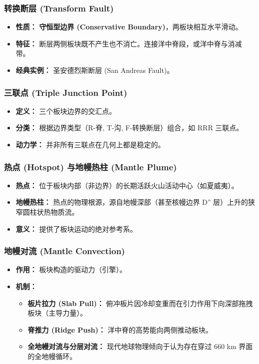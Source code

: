 \documentclass[12pt,a4paper]{article}
\begin{document}
	\subsubsection{转换断层 (Transform Fault)}
	\begin{itemize}
		\item \textbf{性质：} \textbf{守恒型边界 (Conservative Boundary)}，两板块相互水平滑动。
		\item \textbf{特征：} 断层两侧板块既不产生也不消亡。连接洋中脊段，或洋中脊与消减带。
		\item \textbf{经典实例：} 圣安德烈斯断层 (San Andreas Fault)。
	\end{itemize}
	
	\subsubsection{三联点 (Triple Junction Point)}
	\begin{itemize}
		\item \textbf{定义：} 三个板块边界的交汇点。
		\item \textbf{分类：} 根据边界类型（R-脊, T-沟, F-转换断层）组合，如 RRR 三联点。
		\item \textbf{动力学：} 并非所有三联点在几何上都是稳定的。
	\end{itemize}
	
	\subsubsection{热点 (Hotspot) 与地幔热柱 (Mantle Plume)}
	\begin{itemize}
		\item \textbf{热点：} 位于板块内部（非边界）的长期活跃火山活动中心（如夏威夷）。
		\item \textbf{地幔热柱：} 热点的物理根源，源自地幔深部（甚至核幔边界 D'' 层）上升的狭窄圆柱状热物质流。
		\item \textbf{意义：} 提供了板块运动的绝对参考系。
	\end{itemize}
	
	\subsubsection{地幔对流 (Mantle Convection)}
	\begin{itemize}
		\item \textbf{作用：} 板块构造的驱动力（引擎）。
		\item \textbf{机制：} 
		\begin{itemize}
			\item \textbf{板片拉力 (Slab Pull)：} 俯冲板片因冷却变重而在引力作用下向深部拖拽板块（主导力量）。
			\item \textbf{脊推力 (Ridge Push)：} 洋中脊的高势能向两侧推动板块。
			\item \textbf{全地幔对流与分层对流：} 现代地球物理倾向于认为存在穿过 660 km 界面的全地幔循环。
		\end{itemize}
	\end{itemize}
\end{document}
